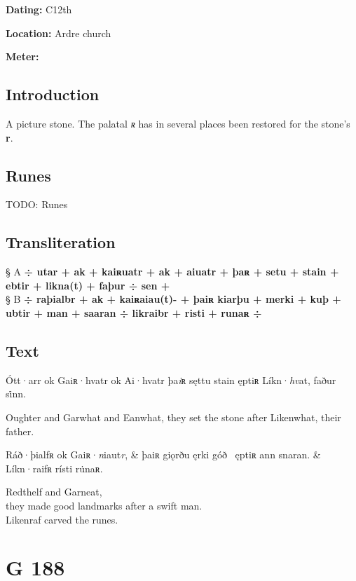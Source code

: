 \begin{flushright}%
\textbf{Dating:} C12th

\textbf{Location:} Ardre church

\textbf{Meter:} \Fornyrdislag
\end{flushright}%

\subsection{Introduction}

A picture stone.  The palatal \emph{ʀ} has in several places been restored for the stone’s \textbf{r}.

\subsection{Runes}

TODO: Runes%

\subsection{Transliteration}

§ A \textbf{÷ utar + ak + kaiʀuatr + ak + aiuatr + þaʀ + setu + stain + ebtir + likna(t) + faþur ÷ sen +} \\
§ B \textbf{÷ raþialbr + ak + kaiʀaiau(t)- + þaiʀ kiarþu + merki + kuþ + ubtir + man + saaran ÷ likraibr + risti + runaʀ ÷}

\subsection{Text}

\bpg\bpa[0]%
\startsub {}%
Ótt·arr ok Gaiʀ·hvatr ok Ai·hvatr þa\emph{i}ʀ sęttu stain ęptiʀ Líkn·\emph{hv}at, faður si̇nn.\endsub\epa

\bpb Oughter and Garwhat and Eanwhat, they set the stone after Likenwhat, their father.\epb\epg


\bvg\bva[B][2]%
Ráð·þialfʀ ok Gaiʀ·\emph{n}iaut\emph{r}, &
þaiʀ giǫrðu ęrki góð \hld\ ęptiʀ ann snaran. &
Líkn·raifʀ rísti ru̇naʀ.\eva

\bvb Redthelf and Garneat, \\
they made good landmarks after a swift man. \\
Likenraf carved the runes.\evb\evg

\sectionline\clearpage


\section{G 188}

